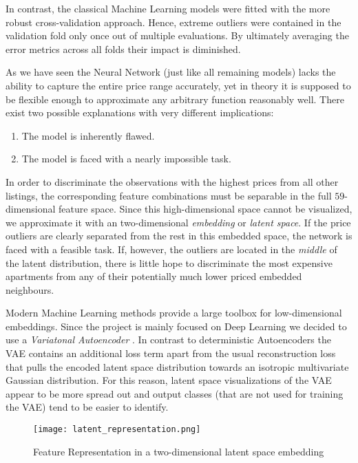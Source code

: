 In contrast, the classical Machine Learning models were fitted with the more robust cross-validation approach.
Hence, extreme outliers were contained in the validation fold only once out of multiple evaluations.
By ultimately averaging the error metrics across all folds their impact is diminished.

As we have seen the Neural Network (just like all remaining models) lacks the ability to capture the entire price range accurately, yet in theory it is supposed to be flexible enough to approximate any arbitrary function reasonably well.
There exist two possible explanations with very different implications:
\begin{enumerate}
  \item The model is inherently flawed.
  \item The model is faced with a nearly impossible task.
\end{enumerate}
In order to discriminate the observations with the highest prices from all other listings, the corresponding feature combinations must be separable in the full $59$-dimensional feature space.
Since this high-dimensional space cannot be visualized, we approximate it with an two-dimensional \emph{embedding} or \emph{latent space}.
If the price outliers are clearly separated from the rest in this embedded space, the network is faced with a feasible task.
If, however, the outliers are located in the \emph{middle} of the latent distribution, there is little hope to discriminate the most expensive apartments from any of their potentially much lower priced embedded neighbours.

Modern Machine Learning methods provide a large toolbox for low-dimensional embeddings.
Since the project is mainly focused on Deep Learning we decided to use a \emph{Variatonal Autoencoder} \citep{kingma2014}.
In contrast to deterministic Autoencoders the VAE contains an additional loss term apart from the usual reconstruction loss that pulls the encoded latent space distribution towards an isotropic multivariate Gaussian distribution.
For this reason, latent space visualizations of the VAE appear to be more spread out and output classes (that are not used for training the VAE) tend to be easier to identify.

\begin{figure}[t]
  \centering
  \texttt{[image: latent\_representation.png]}
  \caption{Feature Representation in a two-dimensional latent space embedding}
  \label{fig:latent-representation}
\end{figure}

